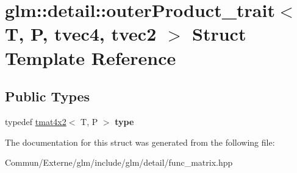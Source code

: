 \hypertarget{structglm_1_1detail_1_1outer_product__trait_3_01_t_00_01_p_00_01tvec4_00_01tvec2_01_4}{}\section{glm\+:\+:detail\+:\+:outer\+Product\+\_\+trait$<$ T, P, tvec4, tvec2 $>$ Struct Template Reference}
\label{structglm_1_1detail_1_1outer_product__trait_3_01_t_00_01_p_00_01tvec4_00_01tvec2_01_4}
\subsection*{Public Types}
\begin{DoxyCompactItemize}
\item 
typedef \hyperlink{structglm_1_1detail_1_1tmat4x2}{tmat4x2}$<$ T, P $>$ {\bfseries type}\hypertarget{structglm_1_1detail_1_1outer_product__trait_3_01_t_00_01_p_00_01tvec4_00_01tvec2_01_4_a15cc3a28bd3e09c75a19ce0349c76d9a}{}\label{structglm_1_1detail_1_1outer_product__trait_3_01_t_00_01_p_00_01tvec4_00_01tvec2_01_4_a15cc3a28bd3e09c75a19ce0349c76d9a}

\end{DoxyCompactItemize}


The documentation for this struct was generated from the following file\+:\begin{DoxyCompactItemize}
\item 
Commun/\+Externe/glm/include/glm/detail/func\+\_\+matrix.\+hpp\end{DoxyCompactItemize}
